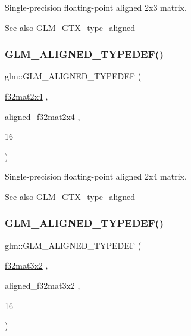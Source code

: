 Single-\/precision floating-\/point aligned 2x3 matrix. \begin{DoxySeeAlso}{See also}
\mbox{\hyperlink{group__gtx__type__aligned}{G\+L\+M\+\_\+\+G\+T\+X\+\_\+type\+\_\+aligned}} 
\end{DoxySeeAlso}
\mbox{\label{group__gtx__type__aligned_gaa52e5732daa62851627021ad551c7680}} 
\subsubsection{\texorpdfstring{GLM\_ALIGNED\_TYPEDEF()}{GLM\_ALIGNED\_TYPEDEF()}\hspace{0.1cm}{\footnotesize\ttfamily [186/209]}}
{\footnotesize\ttfamily glm\+::\+G\+L\+M\+\_\+\+A\+L\+I\+G\+N\+E\+D\+\_\+\+T\+Y\+P\+E\+D\+EF (\begin{DoxyParamCaption}\item[{\mbox{\hyperlink{group__gtc__type__precision_gab0eab14575c18077fd3415539bce685a}{f32mat2x4}}}]{,  }\item[{aligned\+\_\+f32mat2x4}]{,  }\item[{16}]{ }\end{DoxyParamCaption})}

Single-\/precision floating-\/point aligned 2x4 matrix. \begin{DoxySeeAlso}{See also}
\mbox{\hyperlink{group__gtx__type__aligned}{G\+L\+M\+\_\+\+G\+T\+X\+\_\+type\+\_\+aligned}} 
\end{DoxySeeAlso}
\mbox{\label{group__gtx__type__aligned_gac09663c42566bcb58d23c6781ac4e85a}} 
\subsubsection{\texorpdfstring{GLM\_ALIGNED\_TYPEDEF()}{GLM\_ALIGNED\_TYPEDEF()}\hspace{0.1cm}{\footnotesize\ttfamily [187/209]}}
{\footnotesize\ttfamily glm\+::\+G\+L\+M\+\_\+\+A\+L\+I\+G\+N\+E\+D\+\_\+\+T\+Y\+P\+E\+D\+EF (\begin{DoxyParamCaption}\item[{\mbox{\hyperlink{group__gtc__type__precision_ga61653615c76194cdf3454e6e703525e0}{f32mat3x2}}}]{,  }\item[{aligned\+\_\+f32mat3x2}]{,  }\item[{16}]{ }\end{DoxyParamCaption})}

